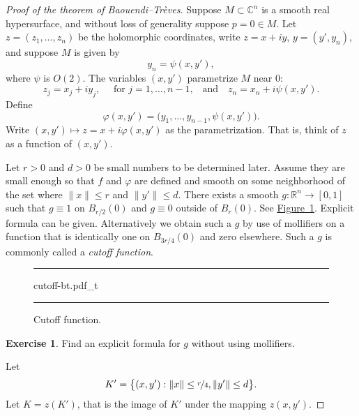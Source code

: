 \documentclass[12pt,openany]{book}
\newcommand{\snorm}[1]{\lVert {#1} \rVert}
\newcommand{\C}{{\mathbb{C}}}
\newcommand{\R}{{\mathbb{R}}}
\newcommand{\myindex}[1]{#1\index{#1}}
\theoremstyle{plain}
\theoremstyle{remark}
\theoremstyle{definition}
\newenvironment{exbox}{%
    \def\FrameCommand{\vrule width 1pt \relax\hspace{10pt}}%
    \MakeFramed{\advance\hsize-\width\FrameRestore}%
}{%
    \endMakeFramed
}
\newenvironment{myfig}{%
\begin{figure}[h!t]
\noindent\rule{\textwidth}{0.5pt}\vspace{12pt}\par\centering}%
{\par\noindent\rule{\textwidth}{0.5pt}
\end{figure}}
\theoremstyle{exercise}
\newtheorem{exercise}{Exercise}[section]
\theoremstyle{example}
\newcommand{\figureref}[1]{\hyperref[#1]{Figure~\ref*{#1}}}
\begin{document}
\begin{proof}[Proof of the theorem of Baouendi--Tr{\`e}ves]
Suppose $M \subset \C^n$ is a smooth real hypersurface, and without loss
of generality suppose $p=0 \in M$.
Let $z=(z_1,\ldots,z_n)$ be the holomorphic coordinates, write $z=x+iy$,
$y=(y',y_n)$, and
suppose $M$ is given by
\begin{equation*}
y_n = \psi(x,y') ,
\end{equation*}
where $\psi$ is $O(2)$.
The variables $(x,y')$ parametrize $M$ near 0:
\begin{equation*}
z_j = x_j+iy_j , \quad \text{ for $j = 1,\ldots,n-1$,} \quad \text{and} \quad
z_n = x_n + i \psi(x,y') .
\end{equation*}
Define
\begin{equation*}
\varphi(x,y') = \bigl(y_1,\ldots,y_{n-1},\psi(x,y')\bigr) .
\end{equation*}
Write $(x,y') \mapsto z = x + i\varphi(x,y')$ as the parametrization.
That is, think of $z$ as a function of $(x,y')$.

Let $r > 0$ and $d > 0$ be small numbers to be determined later.
Assume they are small enough so
that $f$ and $\varphi$ are defined and smooth on some neighborhood of the
set where $\snorm{x} \leq r$ and $\snorm{y'} \leq d$.
There exists a smooth $g \colon \R^n \to [0,1]$ such that $g \equiv 1$ on
$B_{r/2}(0)$ and $g \equiv 0$ outside of $B_{r}(0)$.
See \figureref{fig:cutoff-bt}.
Explicit formula
can be given.  Alternatively we obtain such a $g$ by use of
mollifiers on a function that is identically one on
$B_{3r/4}(0)$ and zero elsewhere.  Such a $g$ is commonly called a
\emph{\myindex{cutoff function}}.

\begin{myfig}
{cutoff-bt.pdf_t}
\caption{Cutoff function.\label{fig:cutoff-bt}}
\end{myfig}

\begin{exbox}
\begin{exercise}
Find an explicit formula for $g$ without using mollifiers.
\end{exercise}
\end{exbox}

Let
\begin{equation*}
K' = \bigl\{ (x,y') : \snorm{x} \leq \nicefrac{r}{4} , \snorm{y'} \leq d
\bigr\} .
\end{equation*}
Let $K = z(K')$, that is the image of $K'$ under the mapping $z(x,y')$.


\end{proof}
\end{document}
